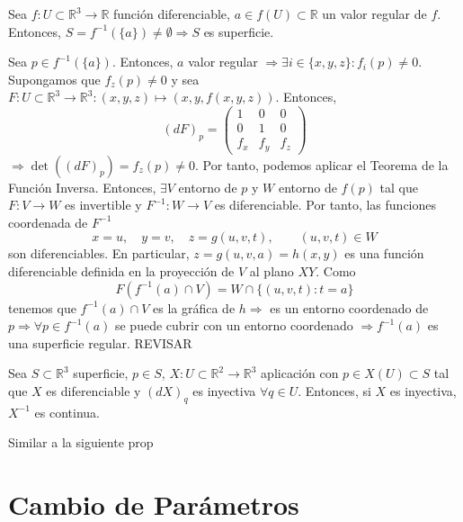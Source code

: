 \begin{prop}
  Sea $f: U \subset \mathbb{R}^{3} \to \mathbb{R}$ función diferenciable, $a \in f(U) \subset \mathbb{R}$ un valor regular de $f$. Entonces, $S = f^{-1}(\{ a \}) \neq \emptyset \Rightarrow S$ es superficie.
\end{prop}

\begin{dem}
  Sea $p \in f^{-1}(\{ a \})$. Entonces, $a$ valor regular $\Rightarrow \exists i \in \{ x, y, z \} : f_{i}(p) \neq 0$. Supongamos que $f_{z}(p) \neq 0$ y sea $F : U \subset \mathbb{R}^{3} \to \mathbb{R}^{3}: (x, y, z) \mapsto (x, y, f(x, y, z))$. Entonces,
  \[
    (d F)_{p} = 
    \begin{pmatrix}
       1 & 0 & 0\\
       0 & 1 & 0\\
       f_{x} & f_{y} & f_{z}
    \end{pmatrix}
  \]
  $\Rightarrow \det ( (d F)_{p}) = f_{z}(p) \neq 0$. Por tanto, podemos aplicar el Teorema de la Función Inversa. Entonces, $\exists V$ entorno de $p$ y $W$ entorno de $f(p)$ tal que $F : V \to W$ es invertible y $F^{-1} : W \to V$ es diferenciable. Por tanto, las funciones coordenada de $F^{-1}$
  \[ 
    x = u, \quad y = v, \quad z = g(u, v, t), \qquad (u, v, t) \in W
  \] 
  son diferenciables. En particular, $z = g(u, v, a) = h(x, y)$ es una función diferenciable definida en la proyección de $V$ al plano $XY$. Como
  \[ 
    F(f^{-1}(a) \cap V) = W \cap \{ (u, v, t) : t = a \}  
  \] 
  tenemos que $f^{-1}(a) \cap V$ es la gráfica de $h \Rightarrow$ es un entorno coordenado de $p \Rightarrow \forall p \in f^{-1}(a)$ se puede cubrir con un entorno coordenado $\Rightarrow f^{-1}(a)$ es una superficie regular. 
  REVISAR
\end{dem}

\begin{prop}
  Sea $S \subset \mathbb{R}^{3}$ superficie, $p \in S$, $X: U \subset \mathbb{R}^{2} \to \mathbb{R}^{3}$ aplicación con $p \in X(U) \subset S$ tal que $X$ es diferenciable y $(dX)_{q}$ es inyectiva $\forall q \in U$. Entonces, si $X$ es inyectiva, $X^{-1}$ es continua.
\end{prop}

\begin{dem}
  Similar a la siguiente prop
\end{dem}

\section{Cambio de Parámetros}

